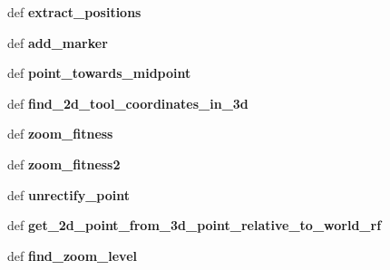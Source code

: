 \begin{DoxyCompactItemize}
\item 
\hypertarget{classautocamera__algorithm_1_1Autocamera_aa53bae6eea8aae0a233a7886549039f2}{def {\bfseries extract\-\_\-positions}}\label{classautocamera__algorithm_1_1Autocamera_aa53bae6eea8aae0a233a7886549039f2}

\item 
\hypertarget{classautocamera__algorithm_1_1Autocamera_a6344825a1f6ebc37210ae6900d142ccd}{def {\bfseries add\-\_\-marker}}\label{classautocamera__algorithm_1_1Autocamera_a6344825a1f6ebc37210ae6900d142ccd}

\item 
\hypertarget{classautocamera__algorithm_1_1Autocamera_ac8bcb5e780d60fc89a01954355336b43}{def {\bfseries point\-\_\-towards\-\_\-midpoint}}\label{classautocamera__algorithm_1_1Autocamera_ac8bcb5e780d60fc89a01954355336b43}

\item 
\hypertarget{classautocamera__algorithm_1_1Autocamera_a5b3cd46a598ddb9a94a92fc1f2a81def}{def {\bfseries find\-\_\-2d\-\_\-tool\-\_\-coordinates\-\_\-in\-\_\-3d}}\label{classautocamera__algorithm_1_1Autocamera_a5b3cd46a598ddb9a94a92fc1f2a81def}

\item 
\hypertarget{classautocamera__algorithm_1_1Autocamera_a99c5c26e53c9caf8b677adc0bdd98d07}{def {\bfseries zoom\-\_\-fitness}}\label{classautocamera__algorithm_1_1Autocamera_a99c5c26e53c9caf8b677adc0bdd98d07}

\item 
\hypertarget{classautocamera__algorithm_1_1Autocamera_a3417f3b93de924c6ce6283e50b8cc1d6}{def {\bfseries zoom\-\_\-fitness2}}\label{classautocamera__algorithm_1_1Autocamera_a3417f3b93de924c6ce6283e50b8cc1d6}

\item 
\hypertarget{classautocamera__algorithm_1_1Autocamera_aaf38b3bac1aeac2afff5c4ed3543f652}{def {\bfseries unrectify\-\_\-point}}\label{classautocamera__algorithm_1_1Autocamera_aaf38b3bac1aeac2afff5c4ed3543f652}

\item 
\hypertarget{classautocamera__algorithm_1_1Autocamera_a22083eb61be00dfbc8edf68b67a13119}{def {\bfseries get\-\_\-2d\-\_\-point\-\_\-from\-\_\-3d\-\_\-point\-\_\-relative\-\_\-to\-\_\-world\-\_\-rf}}\label{classautocamera__algorithm_1_1Autocamera_a22083eb61be00dfbc8edf68b67a13119}

\item 
\hypertarget{classautocamera__algorithm_1_1Autocamera_a37c2f7b8a0409809580f0f82189f7dc1}{def {\bfseries find\-\_\-zoom\-\_\-level}}\label{classautocamera__algorithm_1_1Autocamera_a37c2f7b8a0409809580f0f82189f7dc1}


\end{DoxyCompactItemize}
